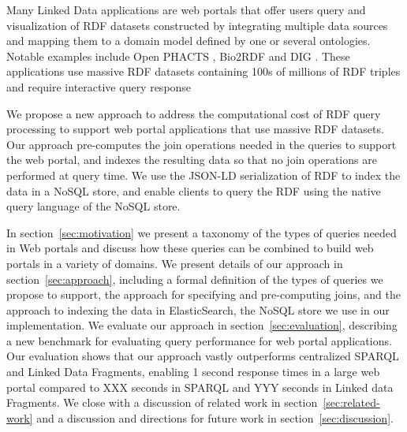 Many Linked Data applications are web portals that offer users query and visualization of RDF datasets constructed by integrating multiple data sources and mapping them to a domain model defined by one or several ontologies.
Notable examples include Open PHACTS \cite{Groth_Loizou_Gray_Goble_Harland_Pettifer_2014}, Bio2RDF \cite{callahan2013bio2rdf} and DIG \cite{szekely2015building}.
These applications use massive RDF datasets containing 100s of millions of RDF triples and require interactive query response

We propose a new approach to address the computational cost of RDF query processing to support web portal applications that use massive RDF datasets.
Our approach pre-computes the join operations needed in the queries to support the web portal, and indexes the resulting data so that no join operations are performed at query time.
We use the JSON-LD serialization of RDF \cite{Lanthaler:2012:UJC:2307819.2307827} to index the data in a NoSQL store, and enable clients to query the RDF using the native query language of the NoSQL store.

In section~\ref{sec:motivation} we present a taxonomy of the types of queries needed in Web portals and discuss how these queries can be combined to build web portals in a variety of domains.
We present details of our approach in section~\ref{sec:approach}, including a formal definition of the types of queries we propose to support, the approach for specifying and pre-computing joins, and the approach to indexing the data in ElasticSearch, the NoSQL store we use in our implementation.
We evaluate our approach in section~\ref{sec:evaluation}, describing a new benchmark for evaluating query performance for web portal applications. 
Our evaluation shows that our approach vastly outperforms centralized SPARQL and Linked Data Fragments, enabling 1 second response times in a large web portal compared to XXX seconds in SPARQL and YYY seconds in Linked data Fragments.
We close with a discussion of related work in section~\ref{sec:related-work} and a discussion and directions for future work in section~\ref{sec:discussion}.

